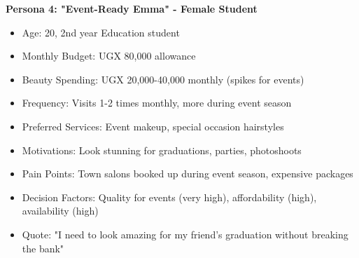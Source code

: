 \textbf{Persona 4: "Event-Ready Emma" - Female Student}
\begin{itemize}[leftmargin=2em]
    \item Age: 20, 2nd year Education student
    \item Monthly Budget: UGX 80,000 allowance
    \item Beauty Spending: UGX 20,000-40,000 monthly (spikes for events)
    \item Frequency: Visits 1-2 times monthly, more during event season
    \item Preferred Services: Event makeup, special occasion hairstyles
    \item Motivations: Look stunning for graduations, parties, photoshoots
    \item Pain Points: Town salons booked up during event season, expensive packages
    \item Decision Factors: Quality for events (very high), affordability (high), availability (high)
    \item Quote: "I need to look amazing for my friend's graduation without breaking the bank"
\end{itemize}

\vspace{1em}

